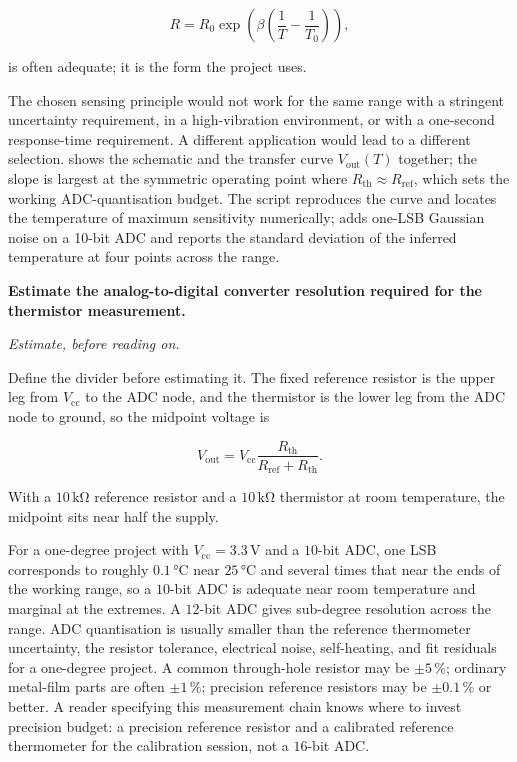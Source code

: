\[
R = R_{0} \exp\!\left(\beta \left(\frac{1}{T} - \frac{1}{T_{0}}
\right)\right),
\]

is often adequate; it is the form the project uses.

The chosen sensing principle would not work for the same range with
a stringent uncertainty requirement, in a high-vibration
environment, or with a one-second response-time requirement. A
different application would lead to a different selection.
 shows the schematic and
the transfer curve $V_{\text{out}}(T)$ together; the slope is
largest at the symmetric operating point where
$R_{\text{th}} \approx R_{\text{ref}}$, which sets the working
ADC-quantisation budget. The script
 reproduces the curve and
locates the temperature of maximum sensitivity numerically;
 adds one-LSB Gaussian noise
on a 10-bit ADC and reports the standard deviation of the inferred
temperature at four points across the range.



\begin{estimation}
\textbf{Estimate the analog-to-digital converter resolution required
for the thermistor measurement.}

\smallskip
\textit{Estimate, before reading on.}

\smallskip
Define the divider before estimating it. The fixed reference
resistor is the upper leg from $V_{\text{cc}}$ to the ADC node, and
the thermistor is the lower leg from the ADC node to ground, so the
midpoint voltage is

\[
V_{\text{out}} = V_{\text{cc}} \frac{R_{\text{th}}}{R_{\text{ref}}
+ R_{\text{th}}}.
\]

With a $10 \,\si{\kilo\ohm}$ reference resistor and a $10 \,\si
{\kilo\ohm}$ thermistor at room temperature, the midpoint sits near
half the supply.

For a one-degree project with $V_{\text{cc}} = 3.3 \,\si{\volt}$ and
a $10$-bit ADC, one LSB corresponds to roughly
$0.1 \,\si{\degreeCelsius}$ near $25 \,\si{\degreeCelsius}$ and
several times that near the ends of the working range, so a $10$-bit
ADC is adequate near room temperature and marginal at the extremes.
A $12$-bit ADC gives sub-degree resolution across the range. ADC
quantisation is usually smaller than the reference thermometer
uncertainty, the resistor tolerance, electrical noise, self-heating,
and fit residuals for a one-degree project. A common through-hole
resistor may be $\pm 5\,\%$; ordinary metal-film parts are often
$\pm 1\,\%$; precision reference resistors may be $\pm 0.1\,\%$ or
better. A reader specifying this measurement chain knows where to
invest precision budget: a precision reference resistor and a
calibrated reference thermometer for the calibration session, not a
$16$-bit ADC.
\end{estimation}

